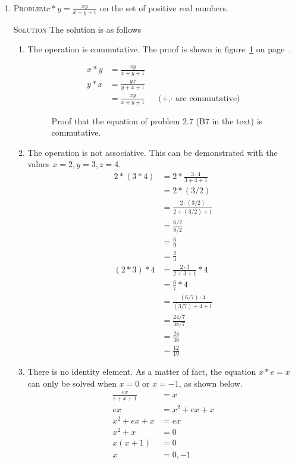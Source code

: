 \documentclass{amsart}
\newcommand{\Solution}{\textsc{Solution}\xspace}
\newcommand{\Problem}{\textsc{Problem}\xspace}
\begin{document}
\begin{enumerate}
   \item \Problem $\displaystyle x * y = \frac{xy}{x + y + 1}$ on the set of
   positive real numbers.

   \noindent \Solution The solution is as follows
   \begin{enumerate}
      \item The operation is commutative. The proof is shown in 
      figure~\ref{fig:b7_com} on page~\pageref{fig:b7_com}.

      \begin{figure}
      \caption{Proof that the equation of problem 2.7 (B7 in the text) 
      is commutative.}
      \label{fig:b7_com}
      \begin{align*}
         x * y & = \frac{xy}{x + y + 1} \\
	 y * x & = \frac{yx}{y + x + 1} \\
	       & = \frac{xy}{x + y + 1} && \text{(+,$\cdot$ are commutative)}
      \end{align*}
      \end{figure}

      \item The operation is not associative. This can be demonstrated 
      with the values $x = 2, y = 3, z = 4$.
      \begin{align*}
         2 * (3 * 4) & = 2 * \frac{3 \cdot 4}{3 + 4 + 1}   \\
	             & = 2 * (3/2) \\
		     & = \frac{2 \cdot (3/2)}{2 + (3/2) + 1} \\
		     & = \frac{6/2}{9/2} \\
		     & = \frac{6}{9} \\
		     & = \frac{2}{3} \\
	 (2 * 3) * 4 & = \frac{2 \cdot 3}{2 + 3 + 1} * 4 \\
	             & = \frac{6}{7} * 4 \\
		     & = \frac{(6/7) \cdot 4}{(3/7) + 4 + 1} \\
		     & = \frac{24/7}{38/7} \\
		     & = \frac{24}{38} \\
		     & = \frac{12}{19}
      \end{align*}

      \item There is no identity element. As a matter of fact,
      the equation $x * e = x$ can only be solved when $x = 0$ or $x = -1$, as 
      shown below.
      \begin{align*}
         \frac{ex}{e + x + 1} & = x \\
	 ex                   & = x^2 + ex + x \\
	 x^2 + ex + x         & = ex \\
	 x^2 + x              & = 0 \\
	 x(x+1)               & = 0 \\
	 x                    & = 0, -1
      \end{align*}


\end{enumerate}
\end{enumerate}
\end{document}
